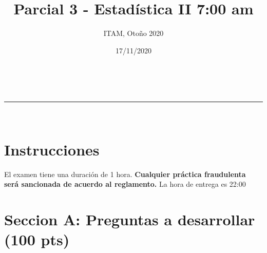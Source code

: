 \documentclass[addpoints]{exam}
\makeatletter
\newcommand{\linia}{\rule{\linewidth}{0.5pt}}
\theoremstyle{mytheor}
\renewcommand{\maketitle}{
    \begin{center}
    \vspace{2ex}
    {\huge \textsc{\@title}}
    \vspace{1ex}
    \\
    \linia\\
    \@author \hfill \@date
    \vspace{4ex}
    \end{center}
  }
\makeatother
\begin{document}
  
  \title{Parcial 3 - Estadística II 7:00 am}
  
  \author{ITAM, Otoño 2020}
  
  \date{17/11/2020}
  
  \maketitle
  
  \section*{Instrucciones}
 

\vspace{10pt}
  
El examen tiene una duración de 1 hora. \textbf{Cualquier práctica fraudulenta será sancionada de acuerdo al reglamento.} La hora de entrega es 22:00 

\section*{Seccion A: Preguntas a desarrollar (100 pts)}
  
\end{document}
